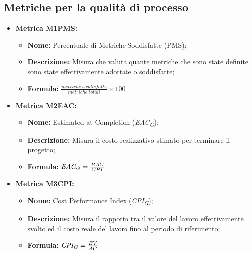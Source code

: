 \subsection{Metriche per la qualità di processo}
\begin{itemize}
    \item \hypertarget{item:M1PMS}{\textbf{Metrica M1PMS:}}
    \begin{minipage}[t]{0.9\textwidth}
           \begin{itemize}
            \item \textbf{Nome:} Percentuale di Metriche Soddisfatte (PMS);
            \item \textbf{Descrizione:} Misura che valuta quante metriche che sono state definite sono state effettivamente adottate o soddisfatte;
            \item \textbf{Formula:} $\frac{metriche \ soddisfatte}{metriche \ totali}\times 100$
           \end{itemize}
        \end{minipage}

    \item \hypertarget{item:M2EAC}{\textbf{Metrica M2EAC:}}
     \begin{minipage}[t]{0.9\textwidth}
          \begin{itemize}
              \item \textbf{Nome:} Estimated at Completion (\textit{EAC}\textsubscript{\textit{G}});
              \item \textbf{Descrizione:} Misura il costo realizzativo stimato per terminare il progetto;
              \item \textbf{Formula:} $\textit{EAC}\textsubscript{\textit{G}} = \frac{BAC}{CPI}$
          \end{itemize}
        \end{minipage}

    \item \hypertarget{item:M3CPI}{\textbf{Metrica M3CPI:}}
    \begin{minipage}[t]{0.9\textwidth}
          \begin{itemize}
              \item \textbf{Nome:} Cost Performance Index (\textit{CPI}\textsubscript{\textit{G}});
              \item \textbf{Descrizione:} Misura il rapporto tra il valore del lavoro effettivamente svolto ed il costo reale del lavoro fino al periodo di riferimento;
              \item \textbf{Formula:} $\textit{CPI}\textsubscript{\textit{G}} = \frac{EV}{AC}$
          \end{itemize}
        \end{minipage}


\end{itemize}

